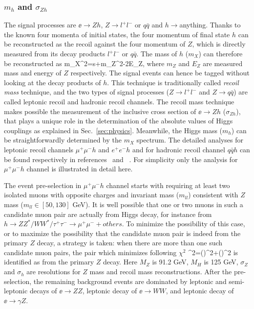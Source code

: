 \subsubsection{$m_h$ and $\sigma_{Zh}$}
\label{sec:higgs:sigmazh}
The signal processes are $\ee\to Zh$, $Z\to l^+l^-$ or $q\bar{q}$ and 
$h\to$anything. Thanks to the known four momenta of initial states, 
the four momentum of final state $h$ can be reconstructed 
as the recoil against the four momentum of $Z$, which is directly
measured from its decay products $l^+l^-$ or $q\bar{q}$. 
The mass of $h$ ($m_X$) can therefore be reconstructed as
\beq
m_X^2=s+m_Z^2-2E_Z,
where $m_Z$ and $E_Z$ are measured mass and energy of $Z$
respectively. The signal events can hence be tagged without looking
at the decay products of $h$. This technique is traditionally called
{\it recoil mass} technique, and the two types of signal processes 
($Z\to l^+l^-$ and $Z\to q\bar{q}$) are called
leptonic recoil and hadronic recoil channels. The recoil mass technique
makes possible the measurement of the inclusive cross section of $\ee\to Zh$ ($\sigma_{Zh}$),
that plays a unique role in the determination of the absolute values of
Higgs couplings as explained in Sec.~\ref{sec:physics}.
Meanwhile, the Higgs mass ($m_h$) can be straightforwardly determined by 
the $m_X$ spectrum. The detailed analyses for leptonic recoil channels
$\mu^+\mu^-h$ and $e^+e^-h$ and for hadronic recoil channel $q\bar{q}h$
can be found respectively in references~\cite{Yan:2016xyx} and 
~\cite{Tomita:2015,Thomson:2015jda,Miyamoto:2013zva}. For simplicity only the analysis for $\mu^+\mu^-h$ channel is illustrated in detail here.

The event pre-selection in $\mu^+\mu^-h$ channel starts with requiring at least 
two isolated muons with opposite charges and invariant mass ($m_{ll}$) consistent 
with $Z$ mass ($m_{ll}\in[50,130]$ GeV). 
It is well possible that one or two muons in such a candidate 
muon pair are actually from Higgs decay, for instance from 
$h\to ZZ^*/WW^*/\tau^+\tau^-\to \mu^+\mu^-+others$. To minimize the possibility of
this case, or to maximize the possibility that the candidate muon pair is 
indeed from the primary $Z$ decay, a strategy is taken:
when there are more than one such candidate muon pairs,
the pair which minimizes following $\chi^2$ 
\beq
\chi^2=()^2+()^2
is identified as from the primary $Z$ decay. Here $M_Z$ is 91.2 GeV,
$M_H$ is 125 GeV, $\sigma_Z$ and $\sigma_h$ are resolutions for 
$Z$ mass and recoil mass reconstructions. 
After the pre-selection, the remaining background events are dominated by
leptonic and semi-leptonic decays of $\ee\to ZZ$, leptonic decay of $\ee\to WW$, 
and leptonic decay of $\ee\to \gamma Z$. 

